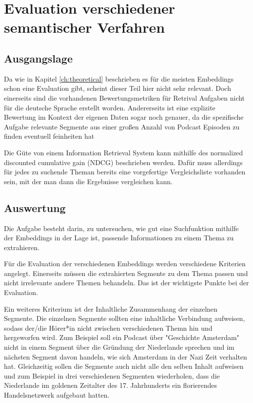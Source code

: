 \chapter{Evaluation verschiedener semantischer Verfahren}\label{ch:experiments}

\section{Ausgangslage}

Da wie in Kapitel \autoref*{ch:theoretical} beschrieben es für die meisten Embeddings schon eine Evaluation gibt, scheint dieser Teil hier nicht sehr relevant.
Doch einerseits sind die vorhandenen Bewertungsmetriken für Retrival Aufgaben nicht für die deutsche Sprache erstellt worden.
Andererseits ist eine explizite Bewertung im Kontext der eigenen Daten sogar noch genauer, da die spezifische Aufgabe relevante Segmente aus einer großen Anzahl von Podcast Episoden zu finden eventuell feinheiten hat


Die Güte von einem Information Retrieval System kann mithilfe des normalized discounted cumulative gain (NDCG) beschrieben werden. 
Dafür muss allerdings für jedes zu suchende Theman bereits eine vorgefertige Vergleichsliste vorhanden sein, mit der man dann die Ergebnisse vergleichen kann.


\section{Auswertung}


Die Aufgabe besteht darin, zu untersuchen, wie gut eine Suchfunktion mithilfe der Embeddings in der Lage ist, passende Informationen zu einem Thema zu extrahieren.

Für die Evaluation der verschiedenen Embeddings werden verschiedene Kriterien angelegt.
Einerseits müssen die extrahierten Segmente zu dem Thema passen und nicht irrelevante andere Themen behandeln.
Das ist der wichtigste Punkte bei der Evaluation.

Ein weiteres Kriterium ist der Inhaltliche Zusammenhang der einzelnen Segmente.
Die einzelnen Segmente sollten eine inhaltliche Verbindung aufweisen, sodass der/die Hörer*in nicht zwischen verschiedenen Themn hin und hergeworfen wird.
Zum Beispiel soll ein Podcast über "Geschichte Amsterdam" nicht in einem Segment über die Gründung der Niederlande sprechen und im nächsten Segment davon handeln, wie sich Amsterdam in der Nazi Zeit verhalten hat.
Gleichzeitig sollen die Segmente auch nicht alle den selben Inhalt aufweisen und zum Beispiel in drei verschiedenen Segmenten wiederholen, dass die Niederlande im goldenen Zeitalter des 17. Jahrhunderts ein florierendes Handelsnetzwerk aufgebaut hatten.
 
